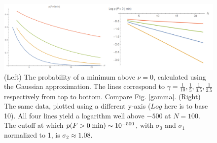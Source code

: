 \documentclass[12pt]{article}
\begin{document}
\begin{figure} 
  \centering
  \includegraphics[width=\linewidth]{PVaryingWithNGaussian.png}
  \caption{(Left) The probability of a minimum above $\nu=0$, calculated using the Gaussian approximation. The lines correspond to $\gamma = \frac{1}{10}, \frac{1}{5}, \frac{1}{3.5}, \frac{1}{2.5}$ respectively from top to bottom. Compare Fig. \ref{gamma}. (Right) The same data, plotted using a different y-axis ($Log$ here is to base 10). All four lines yield a logarithm well above $-500$ at $N=100$. The cutoff at which $p(F>0|{\rm min}) \sim 10^{-500}$, with $\sigma_0$ and $\sigma_1$ normalized to 1,  is $\sigma_2 \approx 1.08$.}
  \label{PVaryingWithNGaussian}
\end{figure}



\end{document}

